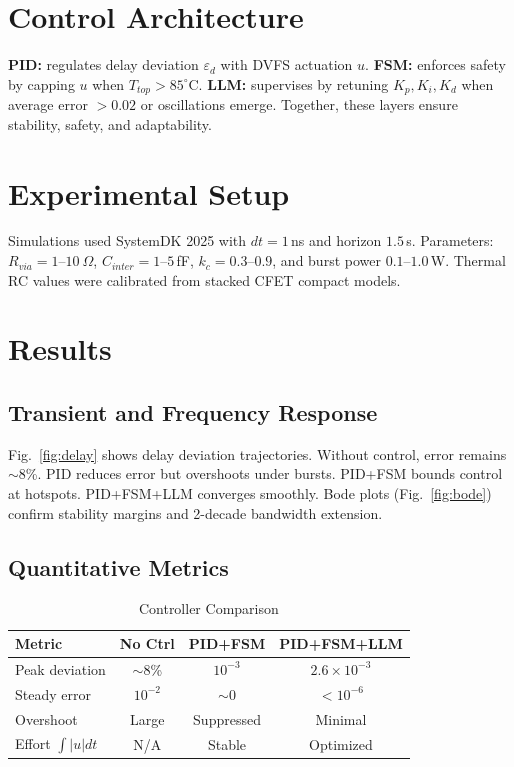 \documentclass[conference]{IEEEtran}
\begin{document}
\section{Control Architecture}
\textbf{PID:} regulates delay deviation $\varepsilon_d$ with DVFS actuation $u$.  
\textbf{FSM:} enforces safety by capping $u$ when $T_{top}>85^\circ$C.  
\textbf{LLM:} supervises by retuning $K_p,K_i,K_d$ when average error $>0.02$ or oscillations emerge.  
Together, these layers ensure stability, safety, and adaptability.

\section{Experimental Setup}
Simulations used SystemDK 2025 with $dt=1$\,ns and horizon $1.5$\,s. Parameters: $R_{via}=1$--$10~\Omega$, $C_{inter}=1$--$5$\,fF, $k_c=0.3$--$0.9$, and burst power $0.1$--$1.0$\,W. Thermal RC values were calibrated from stacked CFET compact models.

\section{Results}
\subsection{Transient and Frequency Response}
Fig.~\ref{fig:delay} shows delay deviation trajectories. Without control, error remains $\sim$8\%. PID reduces error but overshoots under bursts. PID+FSM bounds control at hotspots. PID+FSM+LLM converges smoothly.  
Bode plots (Fig.~\ref{fig:bode}) confirm stability margins and 2-decade bandwidth extension.

\subsection{Quantitative Metrics}
\begin{table}[h]
\centering
\caption{Controller Comparison}
\begin{tabular}{|l|c|c|c|}
\hline
Metric & No Ctrl & PID+FSM & PID+FSM+LLM \\
\hline
Peak deviation & $\sim$8\% & $10^{-3}$ & $2.6\times 10^{-3}$ \\
Steady error & $10^{-2}$ & $\sim$0 & $<10^{-6}$ \\
Overshoot & Large & Suppressed & Minimal \\
Effort $\int|u|dt$ & N/A & Stable & Optimized \\
\hline
\end{tabular}
\end{table}
\end{document}
